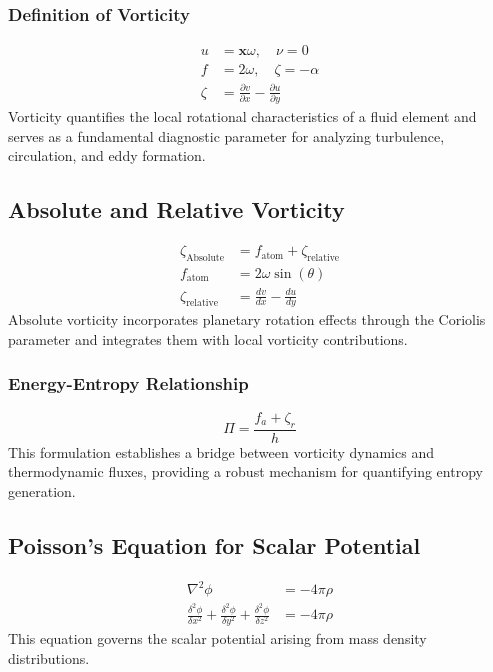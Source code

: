 \documentclass[12pt]{article}
\begin{document}
    \subsubsection*{Definition of Vorticity}
    \begin{align}
        u &= \boldsymbol{x} \omega, \quad \nu=0 \\
        f &= 2 \omega, \quad \zeta=-\alpha \\
        \zeta &= \frac{\partial v}{\partial x} - \frac{\partial u}{\partial y}
    \end{align}
    Vorticity quantifies the local rotational characteristics of a fluid element and serves as a fundamental diagnostic parameter for analyzing turbulence, circulation, and eddy formation.

    \subsection*{Absolute and Relative Vorticity}
    \begin{align}
        \zeta_\text{Absolute} &= f_\text{atom} + \zeta_\text{relative} \\
        f_\text{atom} &= 2 \omega \sin(\theta) \\
        \zeta_{\text {relative }} &=\frac{d v}{d x}-\frac{d u}{d y}
    \end{align}
    Absolute vorticity incorporates planetary rotation effects through the Coriolis parameter and integrates them with local vorticity contributions.

    \subsubsection*{Energy-Entropy Relationship}
    \begin{equation*}
        \Pi = \frac{f_a + \zeta_r}{h}
    \end{equation*}
    This formulation establishes a bridge between vorticity dynamics and thermodynamic fluxes, providing a robust mechanism for quantifying entropy generation.

    \subsection*{Poisson's Equation for Scalar Potential}
    \begin{align}
        \nabla^2 \phi &= -4 \pi \rho \\
        \frac{\delta^2 \phi}{\delta x^2}+\frac{\delta^2 \phi}{\delta y^2}+\frac{\delta^2 \phi}{\delta z^2} &= -4 \pi \rho
    \end{align}
    This equation governs the scalar potential arising from mass density distributions.
\end{document}
